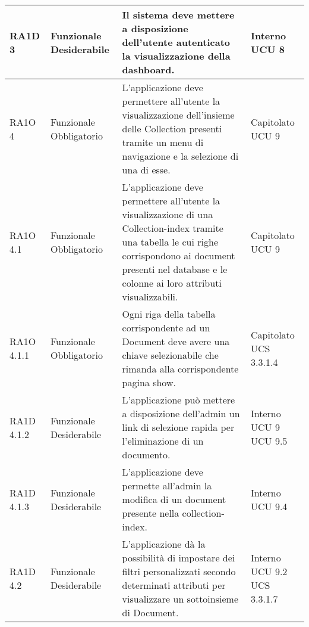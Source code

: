 \begin{center}
\begin{longtable}{ | l | p{2cm} | p{5cm} | p{1.7cm} |}
        RA1D 3 & Funzionale \newline  Desiderabile  & Il sistema deve mettere a disposizione dell'utente autenticato la visualizzazione della dashboard. &  Interno \newline  UCU 8 \newline  \\ \hline      
        RA1O 4 & Funzionale \newline  Obbligatorio  & L'applicazione deve permettere all'utente la visualizzazione dell'insieme delle Collection presenti tramite un menu di navigazione e la selezione di una di esse. &  Capitolato \newline  UCU 9 \newline  \\ \hline      
        RA1O 4.1 & Funzionale \newline  Obbligatorio  & L'applicazione deve permettere all'utente la visualizzazione di una Collection-index tramite una tabella le cui righe corrispondono ai document presenti nel database e le colonne ai loro attributi visualizzabili. &  Capitolato \newline  UCU 9 \newline  \\ \hline      
        RA1O 4.1.1 & Funzionale \newline  Obbligatorio  & Ogni riga della tabella corrispondente ad un Document deve avere una chiave selezionabile che rimanda alla corrispondente pagina show. &  Capitolato \newline  UCS 3.3.1.4 \newline  \\ \hline      
        RA1D 4.1.2 & Funzionale \newline  Desiderabile  & L’applicazione può mettere a disposizione dell’admin un link di selezione rapida per l’eliminazione di un documento. &  Interno \newline  UCU 9 \newline  UCU 9.5 \newline  \\ \hline      
        RA1D 4.1.3 & Funzionale \newline  Desiderabile  & L’applicazione deve permette all’admin la modifica di un document presente nella collection-index. &  Interno \newline  UCU 9.4 \newline  \\ \hline      
        RA1D 4.2 & Funzionale \newline  Desiderabile  & L’applicazione dà la possibilità di impostare dei filtri personalizzati secondo determinati attributi per visualizzare un sottoinsieme di Document. &  Interno \newline  UCU 9.2 \newline  UCS 3.3.1.7 \newline  \\ \hline      

\end{longtable}
\end{center}

